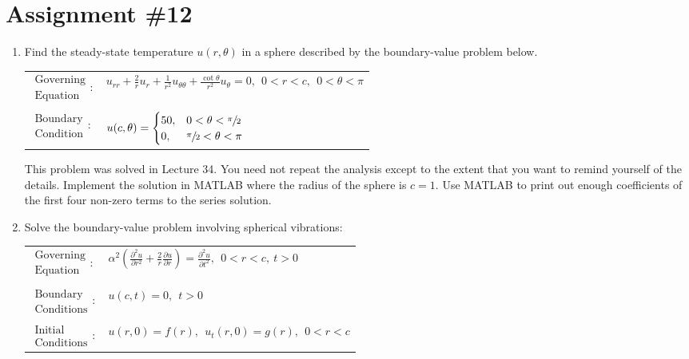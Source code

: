 \chapter{Assignment \#12}
\label{ch:ass12}
\begin{fullwidth}

\begin{enumerate}

\item Find the steady-state temperature $u(r,\theta)$ in a sphere described by the boundary-value problem below.

\begin{table}[h!]
\begin{tabular}{l l}
$\substack{\text{Governing} \\\text{Equation}}: $& $u_{rr} + \frac{2}{r}u_r + \frac{1}{r^2}u_{\theta \theta} + \frac{\cot{\theta}}{r^2}u_{\theta} = 0, \ \ 0<r<c, \ \ 0<\theta < \pi$ \\
& \\
$\substack{\text{Boundary} \\ \text{Condition}}: $& $u(c,\theta)= \begin{cases} 50, & 0 < \theta < \sfrac{\pi}{2} \\ 0, & \sfrac{\pi}{2} < \theta < \pi \end{cases} $\\
\end{tabular}
\end{table}

\noindent This problem was solved in Lecture 34. You need not repeat the analysis except to the extent that you want to remind yourself of the details.  Implement the solution in MATLAB where the radius of the sphere is $c=1$.  Use MATLAB to print out enough coefficients of the first four non-zero terms to the series solution.


\vspace{2.0cm}

\item Solve the boundary-value problem involving spherical vibrations:
\begin{table}
\begin{tabular}{l l}
$\substack{\text{Governing} \\\text{Equation}}: $& $\alpha^2\left(\frac{\partial^2 u}{\partial r^2} + \frac{2}{r}\frac{\partial u}{\partial r}\right) = \frac{\partial^2 u}{\partial t^2}, \ \ 0<r<c, \ t>0$  \\
& \\
$\substack{\text{Boundary} \\ \text{Conditions}}: $& $u(c,t)=0, \ \ t>0$\\
& \\
$\substack{\text{Initial} \\ \text{Conditions}}: $ & $u(r,0) = f(r), \ \ u_{t}(r,0) = g(r), \ \ 0<r<c $ \\
\end{tabular}
\end{table}


\end{enumerate}
\end{fullwidth}
